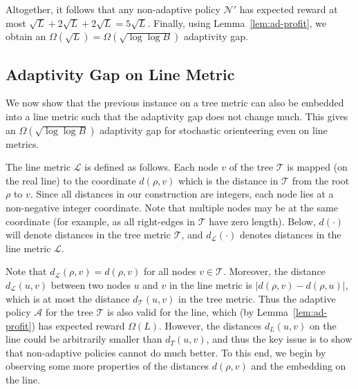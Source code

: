 \documentclass[11pt,letterpaper]{article}
\numberwithin{algorithm}{section}
\newcommand{\A}[0]{{\ensuremath{\mathcal{A}}}\xspace}
\newcommand{\lm}[0]{{\ensuremath{\mathcal{L}}}\xspace}
\newcommand{\N}[0]{{\ensuremath{\mathcal{N}}}\xspace}
\newcommand{\T}{\ensuremath{\mathcal{T}}\xspace}
\begin{document}
Altogether, it follows that any non-adaptive policy $\N'$ has expected reward at most $\sqrt{L} + 2\sqrt{L}+ 2\sqrt{L} =5\sqrt{L}$. Finally, using Lemma~\ref{lem:ad-profit}, we obtain an $\Omega(\sqrt{L})=\Omega\left(\sqrt{\log\log B}\right)$ adaptivity gap.

\subsection{Adaptivity Gap on Line Metric}
We now show that the previous instance on a tree metric can also be embedded into a line metric such that the adaptivity gap does not change much. This gives an $\Omega\left(\sqrt{\log\log B}\right)$ adaptivity gap for stochastic orienteering even on line metrics.

The line metric \lm is defined as follows. Each node $v$ of the tree \T is mapped (on the real line) to the coordinate $d(\rho,v)$ which is the distance in \T from the root $\rho$ to $v$. Since all distances in our construction are integers, each node lies at a non-negative integer coordinate. Note that multiple nodes may be at the same coordinate (for example, as all right-edges in \T have zero length). Below, $d(\cdot)$ will denote distances in the tree metric \T, and $d_\lm(\cdot)$ denotes distances in the line metric \lm.

Note that $d_\lm(\rho,v)=d(\rho,v)$ for all nodes $v\in\T$. Moreover, the distance $d_\lm(u,v)$ between two nodes $u$ and $v$ in the line metric is $|d(\rho,v)-d(\rho,u)|$, which is at most the distance $d_{\T}(u,v)$ in the tree metric. Thus the adaptive policy \A for the tree \T is also valid for the line, which (by Lemma~\ref{lem:ad-profit}) has expected reward $\Omega(L)$.
However, the distances $d_L(u,v)$ on the line could be arbitrarily smaller than $d_T(u,v)$, and thus the key issue is to show that non-adaptive policies cannot do much better. To this end, we begin by observing some more properties of the distances $d(\rho,v)$ and the embedding on the line.
\end{document}
